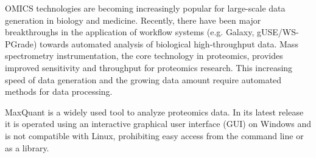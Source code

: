OMICS technologies are becoming increasingly popular for large-scale data
generation in biology and medicine. Recently, there have been major
breakthroughs in the application of workflow systems (e.g.  Galaxy,
gUSE/WS-PGrade) towards automated analysis of biological high-throughput data.
Mass spectrometry instrumentation, the core technology in proteomics, provides
improved sensitivity and throughput for proteomics research. This increasing
speed of data generation and the growing data amount require automated methods
for data processing.

MaxQuant is a widely used tool to analyze proteomics data. In its latest
release it is operated using an interactive graphical user interface (GUI) on
Windows and is not compatible with Linux, prohibiting easy access from the
command line or as a library.

%
%
%
%
